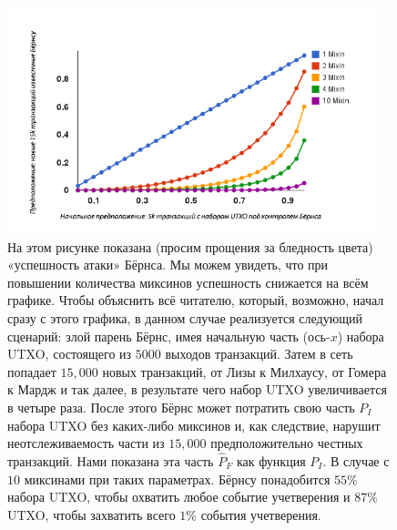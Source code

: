 \documentclass{mrl}
\begin{document}
\begin{figure}[!h]
\centering
\includegraphics[width=0.95\textwidth,height=0.95\textheight,keepaspectratio]{burns.png}
\caption{На этом рисунке показана (просим прощения за бледность цвета) «успешность атаки» Бёрнса. Мы можем увидеть, что при повышении количества миксинов успешность снижается на всём графике. Чтобы объяснить всё читателю, который, возможно, начал сразу с этого графика, в данном случае реализуется следующий сценарий: злой парень Бёрнс, имея начальную часть (ось-$x$) набора UTXO, состоящего из $5000$ выходов транзакций. Затем в сеть попадает $15,000$ новых транзакций, от Лизы к Милхаусу, от Гомера к Мардж и так далее, в результате чего набор UTXO увеличивается в четыре раза. После этого Бёрнс может потратить свою часть $P_I$ набора UTXO без каких-либо миксинов и, как следствие, нарушит неотслеживаемость части из $15,000$ предположительно честных транзакций. Нами показана эта часть $\widehat{P}_F$ как функция $P_I$. В случае с $10$ миксинами при таких параметрах. Бёрнсу понадобится $55\%$ набора UTXO, чтобы охватить любое событие учетверения и $87\%$ UTXO, чтобы захватить всего $1\%$ события учетверения.}
\label{fig1}
\end{figure}
\end{document}
